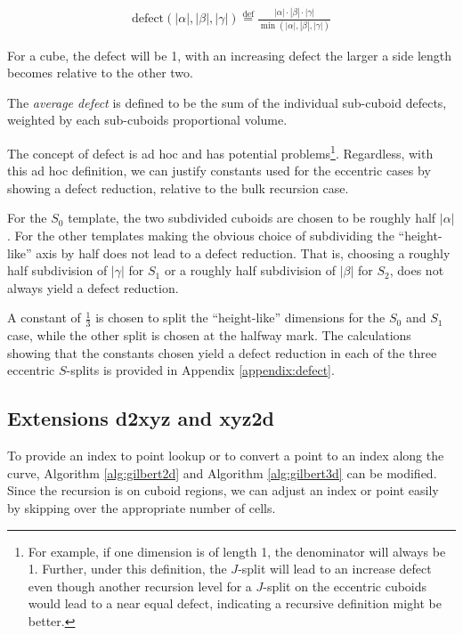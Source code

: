 $$
\begin{array}{l}
  \text{defect}(|\alpha|, |\beta|, |\gamma|) \overset{\mathrm{def}}{=} \frac{ |\alpha| \cdot |\beta| \cdot |\gamma| }{ \min(|\alpha|, |\beta|, |\gamma|) }
\end{array}
$$

For a cube, the defect will be 1, with an increasing defect the larger a side length becomes relative to the other two.

The \textit{average defect} is defined to be the sum of the individual sub-cuboid defects, weighted by each sub-cuboids proportional
volume.

The concept of defect is ad hoc and has potential problems\footnote{For example,
if one dimension is of length 1, the denominator will always be 1.
Further, under this definition, the $J$-split will lead to an increase defect even though another recursion level for a $J$-split on the eccentric
cuboids would lead to a near equal defect, indicating a recursive definition might be better.}.
Regardless, with this ad hoc definition, we can justify constants used for the eccentric cases by showing a defect reduction, relative
to the bulk recursion case.

For the $S_0$ template, the two subdivided cuboids are chosen to be roughly half $|\alpha|$.
For the other templates making the obvious choice of subdividing the ``height-like'' axis by half does
not lead to a defect reduction.
That is, choosing a roughly half subdivision of $|\gamma|$ for $S_1$ or a roughly half subdivision of $|\beta|$ for $S_2$, does
not always yield a defect reduction.

A constant of $\frac{1}{3}$ is chosen to split the ``height-like'' dimensions for the $S_0$ and $S_1$ case,
while the other split is chosen at the halfway mark.
The calculations showing that the constants chosen yield a defect reduction in each of the three eccentric $S$-splits is provided in Appendix \ref{appendix:defect}.

\subsection{Extensions \textbf{d2xyz} and \textbf{xyz2d}}

To provide an index to point lookup or to convert a point to an index along the curve,
Algorithm \ref{alg:gilbert2d} and Algorithm \ref{alg:gilbert3d} can be modified.
Since the recursion is on cuboid regions, we can adjust an index or point easily
by skipping over the appropriate number of cells.


